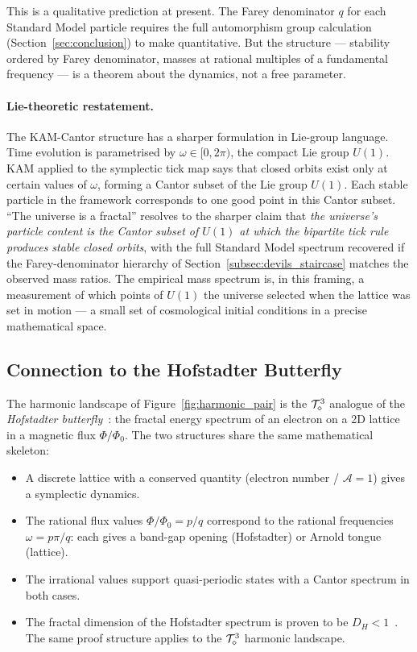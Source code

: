 This is a qualitative prediction at present.
The Farey denominator $q$ for each Standard Model particle requires
the full automorphism group calculation (Section~\ref{sec:conclusion})
to make quantitative.
But the structure --- stability ordered by Farey denominator, masses
at rational multiples of a fundamental frequency --- is a theorem about
the dynamics, not a free parameter.

\paragraph{Lie-theoretic restatement.}
The KAM-Cantor structure has a sharper formulation in Lie-group
language.  Time evolution is parametrised by $\omega \in [0, 2\pi)$,
the compact Lie group $U(1)$.  KAM applied to the symplectic tick
map says that closed orbits exist only at certain values of $\omega$,
forming a Cantor subset of the Lie group $U(1)$.  Each stable
particle in the framework corresponds to one good point in this
Cantor subset.  ``The universe is a fractal'' resolves to the
sharper claim that \emph{the universe's particle content is the
Cantor subset of $U(1)$ at which the bipartite tick rule produces
stable closed orbits}, with the full Standard Model spectrum
recovered if the Farey-denominator hierarchy of
Section~\ref{subsec:devils_staircase} matches the observed mass
ratios.  The empirical mass spectrum is, in this framing, a
measurement of which points of $U(1)$ the universe selected when
the lattice was set in motion --- a small set of cosmological
initial conditions in a precise mathematical space.

\subsection{Connection to the Hofstadter Butterfly}
\label{subsec:hofstadter}

The harmonic landscape of Figure~\ref{fig:harmonic_pair} is the
$\mathcal{T}_\diamond^3$ analogue of the \emph{Hofstadter butterfly}~\cite{hofstadter1976}:
the fractal energy spectrum of an electron on a 2D lattice in a
magnetic flux $\Phi/\Phi_0$.
The two structures share the same mathematical skeleton:
\begin{itemize}
    \item A discrete lattice with a conserved quantity (electron number
          / $\mathcal{A}=1$) gives a symplectic dynamics.
    \item The rational flux values $\Phi/\Phi_0 = p/q$ correspond to
          the rational frequencies $\omega = p\pi/q$: each gives a
          band-gap opening (Hofstadter) or Arnold tongue (lattice).
    \item The irrational values support quasi-periodic states with
          a Cantor spectrum in both cases.
    \item The fractal dimension of the Hofstadter spectrum is proven
          to be $D_H < 1$~\cite{avila2009}.
          The same proof structure applies to the $\mathcal{T}_\diamond^3$ harmonic
          landscape.
\end{itemize}

